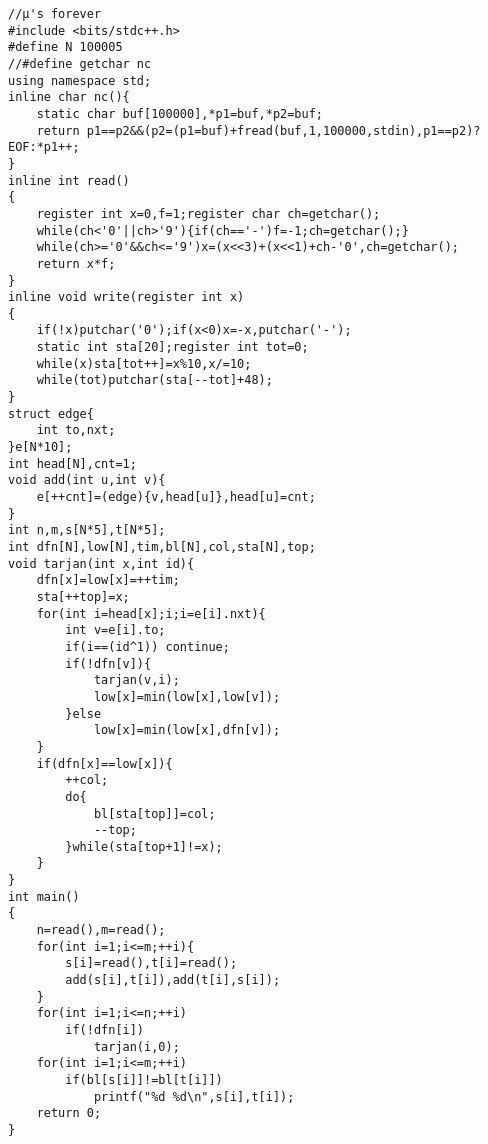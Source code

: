 \begin{verbatim}
//μ's forever
#include <bits/stdc++.h>
#define N 100005
//#define getchar nc
using namespace std;
inline char nc(){
    static char buf[100000],*p1=buf,*p2=buf;
    return p1==p2&&(p2=(p1=buf)+fread(buf,1,100000,stdin),p1==p2)?EOF:*p1++;
}
inline int read()
{
    register int x=0,f=1;register char ch=getchar();
    while(ch<'0'||ch>'9'){if(ch=='-')f=-1;ch=getchar();}
    while(ch>='0'&&ch<='9')x=(x<<3)+(x<<1)+ch-'0',ch=getchar();
    return x*f;
}
inline void write(register int x)
{
    if(!x)putchar('0');if(x<0)x=-x,putchar('-');
    static int sta[20];register int tot=0;
    while(x)sta[tot++]=x%10,x/=10;
    while(tot)putchar(sta[--tot]+48);
}
struct edge{
    int to,nxt;
}e[N*10];
int head[N],cnt=1;
void add(int u,int v){
    e[++cnt]=(edge){v,head[u]},head[u]=cnt;
}
int n,m,s[N*5],t[N*5];
int dfn[N],low[N],tim,bl[N],col,sta[N],top;
void tarjan(int x,int id){
    dfn[x]=low[x]=++tim;
    sta[++top]=x;
    for(int i=head[x];i;i=e[i].nxt){
        int v=e[i].to;
        if(i==(id^1)) continue;
        if(!dfn[v]){
            tarjan(v,i);
            low[x]=min(low[x],low[v]);
        }else
            low[x]=min(low[x],dfn[v]);
    }
    if(dfn[x]==low[x]){
        ++col;
        do{
            bl[sta[top]]=col;
            --top;
        }while(sta[top+1]!=x);
    }
}
int main()
{
    n=read(),m=read();
    for(int i=1;i<=m;++i){
        s[i]=read(),t[i]=read();
        add(s[i],t[i]),add(t[i],s[i]);
    }
    for(int i=1;i<=n;++i)
        if(!dfn[i])
            tarjan(i,0);
    for(int i=1;i<=m;++i)
        if(bl[s[i]]!=bl[t[i]])
            printf("%d %d\n",s[i],t[i]);
    return 0;
}
\end{verbatim}

